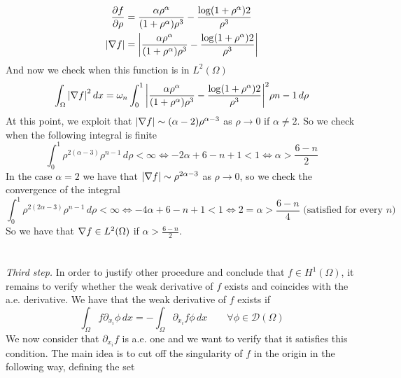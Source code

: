 \begin{align*}
    \frac{\partial f}{\partial \rho} & = \frac{\alpha\rho^{\alpha}}{(1 + \rho^\alpha)\rho^3} - \frac{\log(1 + \rho^\alpha)2}{\rho^3}       \\
    \abs{\nabla f}                    & = \abs{\frac{\alpha\rho^{\alpha}}{(1 + \rho^\alpha)\rho^3} - \frac{\log(1 + \rho^\alpha)2}{\rho^3}}
\end{align*}
And now we check when this function is in \(L^2(\Omega)\)
\begin{align*}
    \int_\Omega \abs{\nabla f}^2 \, dx = \omega_n \int_0^1 \abs{\frac{\alpha\rho^{\alpha}}{(1 + \rho^\alpha)\rho^3} - \frac{\log(1 + \rho^\alpha)2}{\rho^3}}^2 \rho{n-1}\, d\rho \\
\end{align*}
At this point, we exploit that $\abs{\nabla f} \sim (\alpha-2)\rho^{\alpha-3}$ as $\rho \to 0$ if $\alpha \neq 2$.
So we check when the following integral is finite
\begin{equation*}
    \int_0^1 \rho^{2(\alpha-3)}\rho^{n - 1} \, d\rho < \infty \iff -2\alpha + 6 - n + 1 < 1 \iff \alpha > \frac{6-n}{2}
\end{equation*}
In the case \(\alpha = 2\) we have that $\abs{\nabla f} \sim \rho^{2\alpha-3}$ as $\rho \to 0$, so we check the convergence of the integral
\begin{equation*}
    \int_0^1 \rho^{2(2\alpha-3)} \rho^{n-1} \, d\rho < \infty \iff -4\alpha + 6 - n + 1 < 1 \iff 2 = \alpha > \frac{6-n}{4} \text{ (satisfied for every } n \text{)}
\end{equation*}
So we have that \(\nabla f \in L^2(\Omega)\) if \(\alpha > \frac{6-n}{2}\).\\
\\
\vspace{0.1cm}\\
\textit{Third step.} In order to justify other procedure and conclude that $f \in H^1(\Omega)$,
it remains to verify whether the weak derivative of \(f\) exists and coincides with the a.e. derivative.
We have that the weak derivative of \(f\) exists if
\begin{equation}\label{eq:weak_derivative2}
    \int_\Omega f \partial_{x_i} \phi \, dx = - \int_\Omega \partial_{x_i} f \phi \, dx \qquad \forall \phi \in \mathcal{D}(\Omega)
\end{equation}
We now consider that $\partial_{x_i} f$ is a.e. one and we want to verify that it satisfies this condition.
The main idea is to cut off the singularity of \(f\) in the origin in the following way, defining the set
